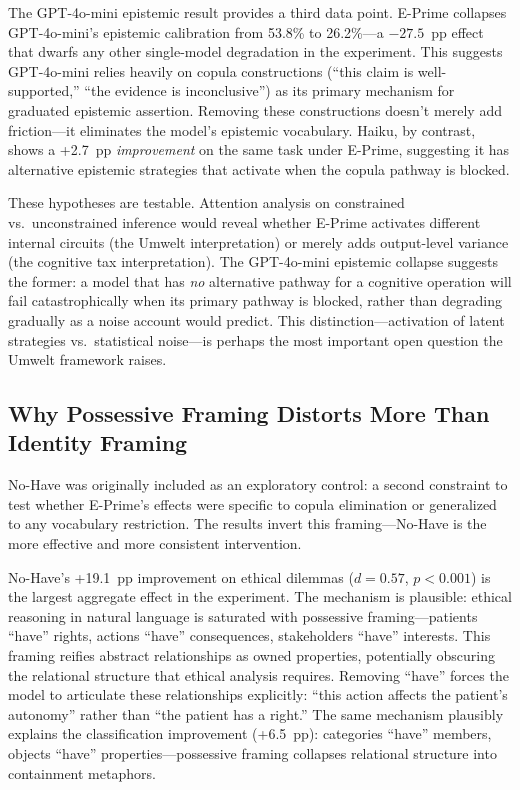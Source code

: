 \documentclass[11pt,a4paper]{article}
\begin{document}
The GPT-4o-mini epistemic result provides a third data point. E-Prime collapses GPT-4o-mini's epistemic calibration from 53.8\% to 26.2\%---a $-27.5$~pp effect that dwarfs any other single-model degradation in the experiment. This suggests GPT-4o-mini relies heavily on copula constructions (``this claim is well-supported,'' ``the evidence is inconclusive'') as its primary mechanism for graduated epistemic assertion. Removing these constructions doesn't merely add friction---it eliminates the model's epistemic vocabulary. Haiku, by contrast, shows a +2.7~pp \emph{improvement} on the same task under E-Prime, suggesting it has alternative epistemic strategies that activate when the copula pathway is blocked.

These hypotheses are testable. Attention analysis on constrained vs.\ unconstrained inference would reveal whether E-Prime activates different internal circuits (the Umwelt interpretation) or merely adds output-level variance (the cognitive tax interpretation). The GPT-4o-mini epistemic collapse suggests the former: a model that has \emph{no} alternative pathway for a cognitive operation will fail catastrophically when its primary pathway is blocked, rather than degrading gradually as a noise account would predict. This distinction---activation of latent strategies vs.\ statistical noise---is perhaps the most important open question the Umwelt framework raises.

\subsection{Why Possessive Framing Distorts More Than Identity Framing}

No-Have was originally included as an exploratory control: a second constraint to test whether E-Prime's effects were specific to copula elimination or generalized to any vocabulary restriction. The results invert this framing---No-Have is the more effective and more consistent intervention.

No-Have's +19.1~pp improvement on ethical dilemmas ($d = 0.57$, $p < 0.001$) is the largest aggregate effect in the experiment. The mechanism is plausible: ethical reasoning in natural language is saturated with possessive framing---patients ``have'' rights, actions ``have'' consequences, stakeholders ``have'' interests. This framing reifies abstract relationships as owned properties, potentially obscuring the relational structure that ethical analysis requires. Removing ``have'' forces the model to articulate these relationships explicitly: ``this action affects the patient's autonomy'' rather than ``the patient has a right.'' The same mechanism plausibly explains the classification improvement (+6.5~pp): categories ``have'' members, objects ``have'' properties---possessive framing collapses relational structure into containment metaphors.
\end{document}
